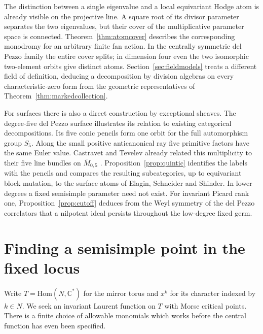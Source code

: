 \documentclass[11pt]{amsart}
\theoremstyle{definition}
\newcommand{\C}{\mathbb C}
\begin{document}
The distinction between a single eigenvalue and a local equivariant Hodge atom is already visible on the projective line. A square root of its divisor parameter separates the two eigenvalues, but their cover of the multiplicative parameter space is connected. Theorem~\ref{thm:atomcover} describes the corresponding monodromy for an arbitrary finite fan action. In the centrally symmetric del Pezzo family the entire cover splits; in dimension four even the two isomorphic two-element orbits give distinct atoms. Section~\ref{sec:fieldmodels} treats a different field of definition, deducing a decomposition by division algebras on every characteristic-zero form from the geometric representatives of Theorem~\ref{thm:markedcollection}.

For surfaces there is also a direct construction by exceptional sheaves. The degree-five del Pezzo surface illustrates its relation to existing categorical decompositions. Its five conic pencils form one orbit for the full automorphism group $S_5$. Along the small positive anticanonical ray five primitive factors have the same Euler value. Castravet and Tevelev already related this multiplicity to their five line bundles on $\overline M_{0,5}$ \cite[Introduction]{CT}. Proposition~\ref{prop:quintic} identifies the labels with the pencils and compares the resulting subcategories, up to equivariant block mutation, to the surface atoms of Elagin, Schneider and Shinder. In lower degrees a fixed semisimple parameter need not exist. For invariant Picard rank one, Proposition~\ref{prop:cutoff} deduces from the Weyl symmetry of the del Pezzo correlators that a nilpotent ideal persists throughout the low-degree fixed germ.

\section{Finding a semisimple point in the fixed locus}\label{sec:exist}
Write $T=\mathrm{Hom}(N,\C^*)$ for the mirror torus and $x^k$ for its character indexed by $k\in N$. We seek an invariant Laurent function on $T$ with Morse critical points. There is a finite choice of allowable monomials which works before the central function has even been specified.
\end{document}
